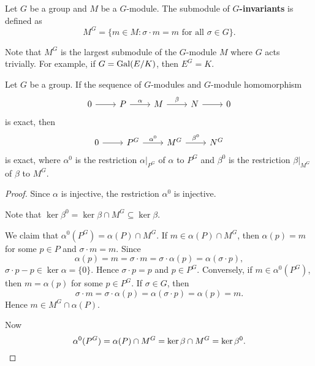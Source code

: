 \begin{definition}
    Let $G$ be a group and $M$ be a $G$-module.
    The submodule of \textbf{$G$-invariants} is defined as
    \[
    M^G=\{m\in M:\sigma\cdot m=m\text{ for all $\sigma\in G$}\}.
    \]
\end{definition}

Note that $M^G$ is the largest submodule of the $G$-module 
$M$ where $G$ acts trivially. For example, if 
$G=\operatorname{Gal}(E/K)$, then $E^G=K$. 

\begin{proposition}
\label{pro:H0}
    Let $G$ be a group. If the sequence
of $G$-modules and $G$-module homomorphism
\[
\begin{tikzcd}
    0 & P & M & N & 0
    \arrow[from=1-1, to=1-2]
    \arrow["\alpha", from=1-2, to=1-3]
    \arrow["\beta", from=1-3, to=1-4]
    \arrow[from=1-4, to=1-5]
    \end{tikzcd}\]
is exact, then 
\[
\begin{tikzcd}
                        0 & P^G & M^G & N^G 
                        \arrow[from=1-1, to=1-2]
                        \arrow["\alpha^0", from=1-2, to=1-3]
                        \arrow["\beta^0", from=1-3, to=1-4]
        \end{tikzcd}
        \]
is exact, where $\alpha^0$ is the restriction $\alpha|_{P^G}$ of $\alpha$ to $P^G$ and
$\beta^0$ is the restriction $\beta|_{M^G}$ of $\beta$ to $M^G$. 
\end{proposition}

\begin{proof}
    Since $\alpha$ is injective, the restriction $\alpha^0$ is injective. 

    Note that 
    $\ker\beta^0=\ker\beta\cap M^G\subseteq\ker\beta$. 
    
    We claim 
    that $\alpha^0(P^G)=\alpha(P)\cap M^G$. If $m\in\alpha(P)\cap M^G$, then 
    $\alpha(p)=m$ for some $p\in P$ and $\sigma\cdot m=m$. Since
    \[
    \alpha(p)=m=\sigma\cdot m=\sigma\cdot\alpha(p)=\alpha(\sigma\cdot p),
    \]
    $\sigma\cdot p-p\in\ker\alpha=\{0\}$. Hence $\sigma\cdot p=p$ and
    $p\in P^G$. Conversely, if $m\in\alpha^0(P^G)$, then 
    $m=\alpha(p)$ for some $p\in P^G$. If $\sigma\in G$, then
    \[
    \sigma\cdot m=\sigma\cdot\alpha(p)=\alpha(\sigma\cdot p)=\alpha(p)=m.
    \]
    Hence $m\in M^G\cap\alpha(P)$.

    Now
    \[
    \alpha^0(P^G)=\alpha(P)\cap M^G=\ker\beta\cap M^G=\ker\beta^0.\qedhere  
    \]
\end{proof}

